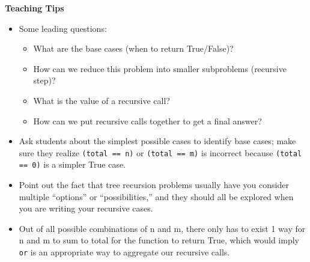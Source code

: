 \begin{blocksection}
\begin{guide}
\textbf{Teaching Tips}
\begin{itemize}
    \item Some leading questions:
    \begin{itemize}
        \item What are the base cases (when to return True/False)?
        \item How can we reduce this problem into smaller subproblems (recursive step)?
        \item What is the value of a recursive call?
        \item How can we put recursive calls together to get a final answer?
    \end{itemize}
    \item Ask students about the simplest possible cases to identify base cases; make sure they realize \lstinline{(total == n)} or \lstinline{(total == m)}  is incorrect because \lstinline{(total == 0)} is a simpler True case.
    \item Point out the fact that tree recursion problems usually have you consider multiple “options” or “possibilities,” and they should all be explored when you are writing your recursive cases.
    \item Out of all possible combinations of n and m, there only has to exist 1 way for n and m to sum to total for the function to return True, which would imply \lstinline{or} is an appropriate way to aggregate our recursive calls.
\end{itemize}
\end{guide}
\end{blocksection}
